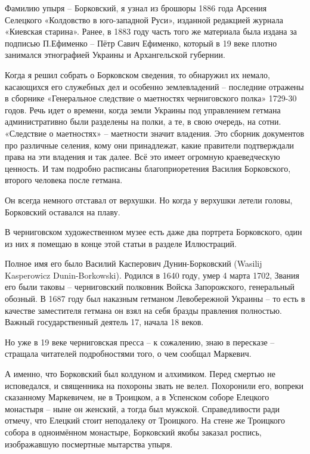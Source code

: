 \documentclass[a5paper,11pt,openany]{article}
\begin{document}
   Фамилию упыря – Борковский, я узнал из брошюры 1886 года Арсения Селецкого «Колдовство в юго-западной Руси»\cite{ars}, изданной редакцией журнала «Киевская старина». Ранее, в 1883 году часть того же материала была издана за подписью П.Ефименко – Пётр Савич Ефименко, который в 19 веке плотно занимался этнографией Украины и Архангельской губернии.

   Когда я решил собрать о Борковском сведения, то обнаружил их немало, касающихся его служебных дел и особенно землевладений – последние отражены в сборнике «Генеральное следствие о маетностях черниговского полка» 1729-30 годов. Речь идет о времени, когда земли Украины под управлением гетмана административно были разделены на полки, а те, в свою очередь, на сотни. «Следствие о маетностях» – маетности значит владения. Это
сборник документов про различные селения, кому они принадлежат, какие правители подтверждали права на эти владения и так далее. Всё это имеет огромную краеведческую ценность. И там подробно расписаны благоприоретения Василия Борковского, второго человека после гетмана. 

    Он всегда немного отставал от верхушки. Но когда у верхушки летели головы, Борковский оставался на плаву.

    В черниговском художественном музее есть даже два портрета Борковского, один из них я помещаю в конце этой статьи в разделе Иллюстраций.

   Полное имя его было Василий Касперович Дунин-Борковский (Wasilij Kasperowicz Dunin-Borkowski). Родился в 1640 году, умер 4 марта 1702, Звания его были таковы – черниговский полковник Войска Запорожского, генеральный обозный. В 1687 году был наказным гетманом Левобережной Украины – то есть в качестве заместителя гетмана он взял на себя бразды правления полностью. Важный государственный деятель 17, начала 18 веков.

   Но уже в 19 веке черниговская пресса – к сожалению, знаю в пересказе – стращала читателей подробностями того, о чем сообщал Маркевич. 

   А именно, что Борковский был колдуном и алхимиком. Перед смертью не исповедался, и священника на похороны звать не велел. Похоронили его, вопреки сказанному Маркевичем, не в Троицком, а в Успенском соборе Елецкого монастыря – ныне он женский, а тогда был мужской. Справедливости ради отмечу, что Елецкий стоит неподалеку от Троицкого. На стене же Троицкого собора в одноимённом монастыре, Борковский якобы заказал роспись, изображавшую посмертные мытарства упыря.
\end{document}
